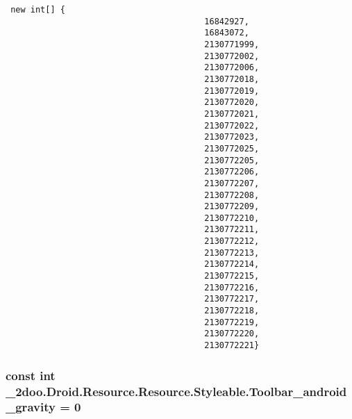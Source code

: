 \begin{Code}\begin{verbatim} new int[] {
                                        16842927,
                                        16843072,
                                        2130771999,
                                        2130772002,
                                        2130772006,
                                        2130772018,
                                        2130772019,
                                        2130772020,
                                        2130772021,
                                        2130772022,
                                        2130772023,
                                        2130772025,
                                        2130772205,
                                        2130772206,
                                        2130772207,
                                        2130772208,
                                        2130772209,
                                        2130772210,
                                        2130772211,
                                        2130772212,
                                        2130772213,
                                        2130772214,
                                        2130772215,
                                        2130772216,
                                        2130772217,
                                        2130772218,
                                        2130772219,
                                        2130772220,
                                        2130772221}
\end{verbatim}
\end{Code}
\hypertarget{class__2doo_1_1_droid_1_1_resource_1_1_styleable_f961db8fd5cfe80b099b08c8483942f9}{
\subsubsection[{Toolbar\_\-android\_\-gravity}]{\setlength{\rightskip}{0pt plus 5cm}const int \_\-2doo.Droid.Resource.Resource.Styleable.Toolbar\_\-android\_\-gravity = 0}}
\label{class__2doo_1_1_droid_1_1_resource_1_1_styleable_f961db8fd5cfe80b099b08c8483942f9}


